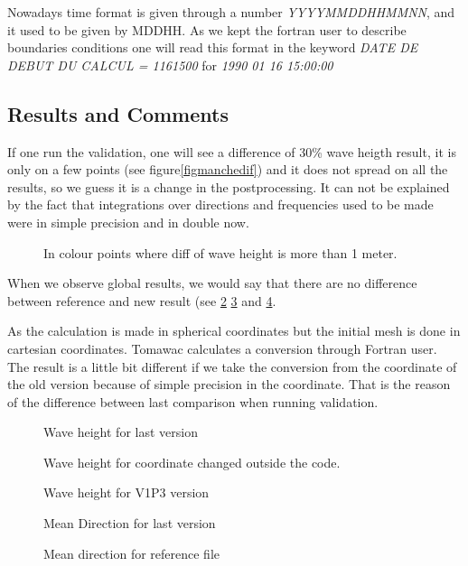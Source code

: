 Nowadays time format is given through a number \textit{YYYYMMDDHHMMNN}, and it used to be given by MDDHH. 
As we kept the fortran user to describe boundaries conditions one will read this format in the keyword \textit{DATE DE DEBUT DU CALCUL = 1161500} for \textit{1990 01 16 15:00:00}

\subsection{Results and Comments}

If one run the validation, one will see a difference of 30\% wave heigth result, it is only on a few points (see figure\ref{figmanchedif}) and it does not spread on all the results, so we guess it is a change in the postprocessing. It can not be explained by the fact that integrations over directions and frequencies used to be made were in simple precision and in double now.
\begin{figure} [!h]
\centering
{}
 \caption{In colour points where diff of wave height is more than 1 meter.}
\label{figmanchehm0}
\end{figure}

When we observe global results, we would say that there are no difference between reference and new result (see \ref{figmanchehm0} \ref{figmanchehm02} and \ref{figmanchehm0v1P3}.

As the calculation is made in spherical coordinates but the initial mesh is done in cartesian coordinates. Tomawac calculates a conversion through Fortran user. The result is a little bit different if we take the conversion from the coordinate of the old version because of simple precision in the coordinate. That is the reason of the difference between last comparison when running validation.  

\begin{figure} [!h]
\centering
{}
 \caption{Wave height for last version}
\label{figmanchehm0}
\end{figure}
\begin{figure} [!h]
\centering
{}
 \caption{Wave height for coordinate changed outside the code.}
\label{figmanchehm02}
\end{figure}
\begin{figure} [!h]
\centering
{}
 \caption{Wave height for V1P3 version}
\label{figmanchehm0v1P3}
\end{figure}
\begin{figure} [!h]
\centering
{}
 \caption{Mean Direction for last version}
\label{figmanchedirection}
\end{figure}
\begin{figure} [!h]
\centering
{}
 \caption{Mean direction for reference file}
\label{figmanchedirectionref}
\end{figure}
